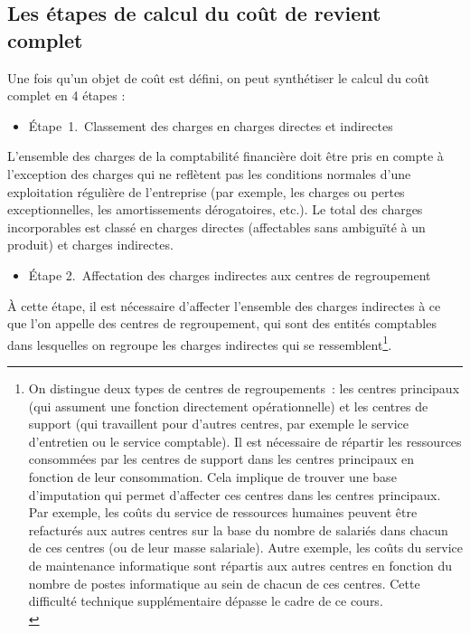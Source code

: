 \documentclass{kaobook}
\begin{document}
\subsection{Les étapes de calcul du coût de revient complet}
\label{sec:orgada5a00}
Une fois qu'un objet de coût est défini, on peut synthétiser le calcul du coût complet en 4 étapes :\\
\begin{itemize}
\item Étape 1. Classement des charges en charges directes et indirectes\\
\end{itemize}
L'ensemble des charges de la comptabilité financière doit être pris en compte à l'exception des charges qui ne reflètent pas les conditions normales d'une exploitation régulière de l'entreprise (par exemple, les charges ou pertes exceptionnelles, les amortissements dérogatoires, etc.). Le total des charges incorporables est classé en charges directes (affectables sans ambiguïté à un produit) et charges indirectes.\\
\begin{itemize}
\item Étape 2. Affectation des charges indirectes aux centres de regroupement\\
\end{itemize}
À cette étape, il est nécessaire d'affecter l'ensemble des charges indirectes à ce que l'on appelle des centres de regroupement, qui sont des entités comptables dans lesquelles on regroupe les charges indirectes qui se ressemblent\footnote{On distingue deux types de centres de regroupements : les centres principaux (qui assument une fonction directement opérationnelle) et les centres de support (qui travaillent pour d'autres centres, par exemple le service d'entretien ou le service comptable). Il est nécessaire de répartir les ressources consommées par les centres de support dans les centres principaux en fonction de leur consommation. Cela implique de trouver une base d'imputation qui permet d'affecter ces centres dans les centres principaux. Par exemple, les coûts du service de ressources humaines peuvent être refacturés aux autres centres sur la base du nombre de salariés dans chacun de ces centres (ou de leur masse salariale). Autre exemple, les coûts du service de maintenance informatique sont répartis aux autres centres en fonction du nombre de postes informatique au sein de chacun de ces centres. Cette difficulté technique supplémentaire dépasse le cadre de ce cours.\\}.\\
\end{document}

